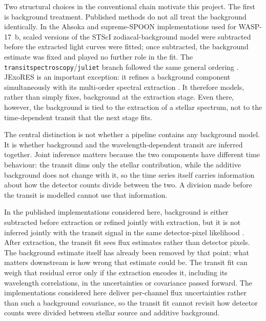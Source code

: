 Two structural choices in the conventional chain motivate this project. The
first is background treatment. Published methods do not all treat the
background identically. In the Ahsoka and supreme-SPOON implementations used
for WASP-17~b, scaled versions of the STScI zodiacal-background model were
subtracted before the extracted light curves were fitted; once subtracted,
the background estimate was fixed and played no further role in the fit.
The
\texttt{transitspectroscopy}/\texttt{juliet} branch followed the same general
ordering \citep{LouieEtAl2025}. JExoRES is an important exception: it refines a
background component simultaneously with its multi-order spectral extraction
\citep{HolmbergMadhusudhan2023}. It therefore models, rather than simply fixes,
background at the extraction stage. Even there, however, the background is
tied to the extraction of a stellar spectrum, not to the time-dependent
transit that the next stage fits.

The central distinction is not whether a pipeline contains any background
model. It is whether background and the wavelength-dependent transit are
inferred together. Joint inference matters because the two components have
different time behaviour: the transit dims only the stellar contribution,
while the additive background does not change with it, so the time series
itself carries information about how the detector counts divide between the
two. A division made before the transit is modelled cannot use that
information.

In the published implementations considered here,
background is either subtracted before extraction or refined jointly with
extraction, but it is not inferred jointly with the transit signal in the same
detector-pixel likelihood
\citep{HolmbergMadhusudhan2023,LouieEtAl2025}. After extraction, the transit
fit sees flux estimates rather than detector pixels. The background estimate
itself has already been removed by that point; what matters downstream is how
wrong that estimate could be. The transit fit can weigh that residual error
only if the extraction encodes it, including its wavelength correlations, in
the uncertainties or covariance passed forward. The implementations
considered here deliver per-channel flux uncertainties rather than such a
background covariance, so the transit fit cannot revisit how detector counts
were divided between stellar source and additive background.

